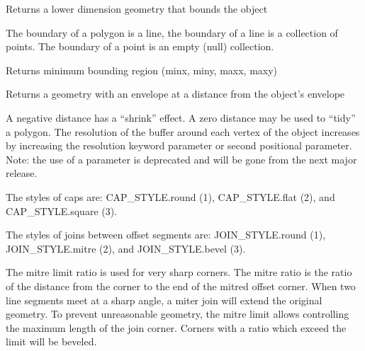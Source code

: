 \documentclass[letterpaper,10pt,english]{sphinxmanual}
\begin{document}
\begin{fulllineitems}

\begin{fulllineitems}
\label{\detokenize{reference:taipanPyRouter.ESegment.boundary}}
Returns a lower dimension geometry that bounds the object

The boundary of a polygon is a line, the boundary of a line is a
collection of points. The boundary of a point is an empty (null)
collection.

\end{fulllineitems}


\begin{fulllineitems}
\label{\detokenize{reference:taipanPyRouter.ESegment.bounds}}
Returns minimum bounding region (minx, miny, maxx, maxy)

\end{fulllineitems}


\begin{fulllineitems}
\label{\detokenize{reference:taipanPyRouter.ESegment.buffer}}
Returns a geometry with an envelope at a distance from the object’s
envelope

A negative distance has a “shrink” effect. A zero distance may be used
to “tidy” a polygon. The resolution of the buffer around each vertex of
the object increases by increasing the resolution keyword parameter
or second positional parameter. Note: the use of a  parameter
is deprecated and will be gone from the next major release.

The styles of caps are: CAP\_STYLE.round (1), CAP\_STYLE.flat (2), and
CAP\_STYLE.square (3).

The styles of joins between offset segments are: JOIN\_STYLE.round (1),
JOIN\_STYLE.mitre (2), and JOIN\_STYLE.bevel (3).

The mitre limit ratio is used for very sharp corners. The mitre ratio
is the ratio of the distance from the corner to the end of the mitred
offset corner. When two line segments meet at a sharp angle, a miter
join will extend the original geometry. To prevent unreasonable
geometry, the mitre limit allows controlling the maximum length of the
join corner. Corners with a ratio which exceed the limit will be
beveled.

\end{fulllineitems}
\end{fulllineitems}
\end{document}
